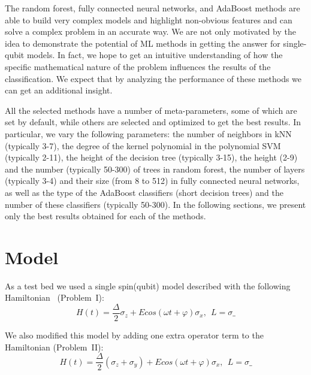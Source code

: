 \documentclass[%
 aip,
 floatfix,
 amsmath,amssymb,
 reprint,%
]{revtex4-1}
\begin{document}
The random forest, fully connected neural networks, and AdaBoost methods  are able to build very complex models and highlight non-obvious features and can solve a complex problem in an accurate way. We are not only motivated by the idea to demonstrate the potential of ML methods in getting the answer for single-qubit models. In fact, we hope to get an intuitive understanding of how the specific mathematical nature of the problem influences the results of the classification. We expect that by analyzing the performance of these methods we can get an additional insight.



All the selected methods have a number of meta-parameters, some of which are set by default, while others are selected and optimized  to get the best results. In particular, we vary the following parameters: the number of neighbors in kNN (typically 3-7), the degree of the kernel polynomial in the polynomial SVM (typically 2-11), the height of the decision tree (typically 3-15), the height (2-9) and the number (typically 50-300) of trees in random forest, the number of layers (typically 3-4) and their size (from 8 to 512) in fully connected neural networks, as well as the type of the AdaBoost classifiers (short decision trees) and the number of these classifiers (typically 50-300). In the following sections, we present only the best results obtained for each of the methods.


\section{Model\label{sec:4}}

As a test bed we  used a single spin(qubit) model described with the following Hamiltonian~\cite{X3} (Problem~I):
\begin{equation}
H(t)= \frac{\Delta}{2} \sigma_z + E cos(\omega t+\varphi) \sigma_x,~~ L = %
\sigma\_
\end{equation}

We also modified this model by adding one extra operator term to the Hamiltonian (Problem~II):
\begin{equation}
H(t)=  \frac{\Delta}{2}(\sigma_z+\sigma_y)+E cos(\omega t+\varphi) \sigma_x, ~~ L = %
\sigma\_
\end{equation}
\end{document}
